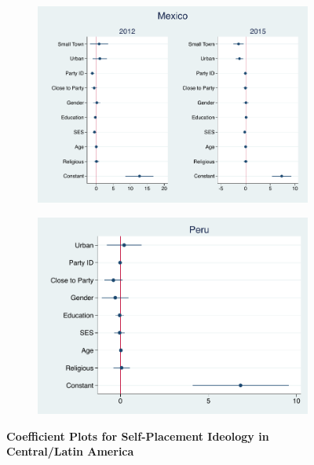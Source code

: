 \documentclass[12pt, titlepage]{article}
\newcommand\tb{\textbf}
\begin{document}
\begin{figure}[H]
	\centering
	\begin{subfigure}[b]{0.475\textwidth}
		\centering
		\includegraphics[width=\textwidth]{IdeologyCoef/Mexico}
	\end{subfigure}
	\hfill
	\begin{subfigure}[b]{0.475\textwidth}  
		\centering 
		\includegraphics[width=\textwidth]{IdeologyCoef/Peru}
	\end{subfigure}
	\caption[ \tb{Self-Placement Ideology - Central/Latin America} ]
	{\tb {Coefficient Plots for Self-Placement Ideology in Central/Latin America} }
	\label{AmericaIdeo}
\end{figure}
\end{document}
